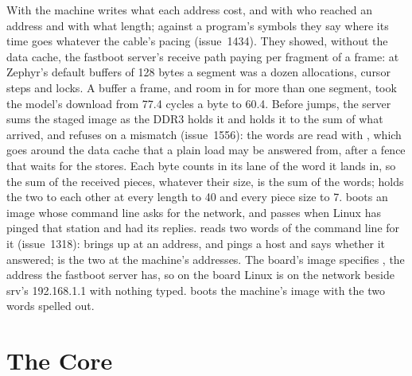 \documentclass[journal,onecolumn,9pt]{IEEEtran}
\begin{document}
With  the machine writes what each address cost, and
with  who reached an address and with what length; against
a program's symbols they say where its time goes whatever the cable's
pacing (issue~1434). They showed, without the data cache, the
fastboot server's receive path
paying per fragment of a frame: at Zephyr's default buffers of 128 bytes
a segment was a dozen allocations, cursor steps and locks. A buffer a
frame, and room in  for more than one segment, took the
model's download from 77.4 cycles a byte to 60.4.
Before  jumps, the server sums the staged image as the DDR3
holds it and holds it to the sum of what arrived, and refuses on a
mismatch (issue~1556): the words are read with , which goes
around the data cache that a plain load may be answered from, after a
fence that waits for the stores. Each byte counts in its lane of the
word it lands in, so the sum of the received pieces, whatever their
size, is the sum of the words;  holds the two
to each other at every length to 40 and every piece size to 7.
 boots an image whose command line asks
 for the network, and passes when Linux has pinged that
station and had its replies.
 reads two words of the command line for it (issue~1318):
 brings  up at an address, and
 pings a host and says whether it answered;
 is the two at the machine's addresses.
The board's image specifies , the
address the fastboot server has, so on the board Linux is on the
network beside srv's 192.168.1.1 with nothing typed.
 boots the machine's image with the two words
spelled out.



\section{The Core}
\label{sec:v-core}
\end{document}
